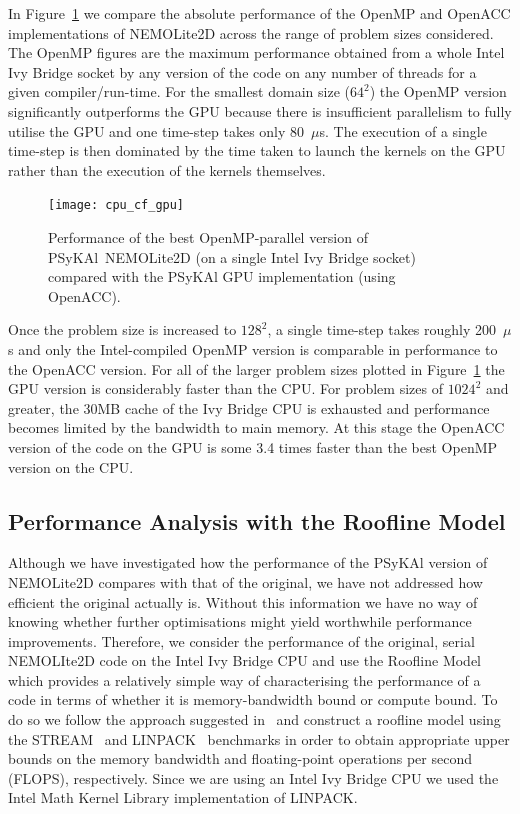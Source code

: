 \documentclass[gmdd, manuscript]{copernicus}
\begin{document}
In Figure~\ref{FIG_cpu_cf_gpu} we compare the absolute performance of
the OpenMP and OpenACC implementations of NEMOLite2D across the range
of problem sizes considered. The OpenMP figures are the maximum
performance obtained from a whole Intel Ivy Bridge socket by any
version of the code on any number of threads for a given
compiler/run-time. For the smallest domain size ($64^2$) the OpenMP
version significantly outperforms the GPU because there is
insufficient parallelism to fully utilise the GPU and one time-step
takes only 80~$\mu$s. The execution of a single time-step is then
dominated by the time taken to launch the kernels on the GPU rather than
the execution of the kernels themselves.

\begin{figure}
\centering
\texttt{[image: cpu\_cf\_gpu]}
\caption{Performance of the best OpenMP-parallel version of {PS}y{KA}l\
  NEMOLite2D (on a single Intel Ivy Bridge socket) compared with the {PS}y{KA}l GPU implementation (using OpenACC).}
\label{FIG_cpu_cf_gpu}
\end{figure}

Once the problem size is increased to $128^2$, a single time-step
takes roughly 200~$\mu$s and only the Intel-compiled OpenMP version is
comparable in performance to the OpenACC version. For all of the
larger problem sizes plotted in Figure~\ref{FIG_cpu_cf_gpu} the GPU
version is considerably faster than the CPU.  For problem sizes of
$1024^2$ and greater, the 30MB cache of the Ivy Bridge CPU is
exhausted and performance becomes limited by the bandwidth to main
memory. At this stage the OpenACC version of the code on the GPU is
some 3.4 times faster than the best OpenMP version on the CPU.

\subsection{Performance Analysis with the Roofline Model}

Although we have investigated how the performance of the {PS}y{KA}l
version of NEMOLite2D compares with that of the original, we have not
addressed how efficient the original actually is. Without this
information we have no way of knowing whether further optimisations
might yield worthwhile performance improvements. Therefore, we
consider the performance of the original, serial NEMOLIte2D code on
the Intel Ivy Bridge CPU and use the Roofline Model~\citep{roofline}
which provides a relatively simple way of characterising the
performance of a code in terms of whether it is memory-bandwidth bound
or compute bound. To do so we follow the approach suggested
in~\cite{para_pearls} and construct a roofline model using the
STREAM~\citep{stream} and LINPACK~\citep{linpack} benchmarks in order
to obtain appropriate upper bounds on the memory bandwidth and
floating-point operations per second (FLOPS), respectively. Since we
are using an Intel Ivy Bridge CPU we used the Intel Math Kernel Library
implementation of LINPACK.
\end{document}
